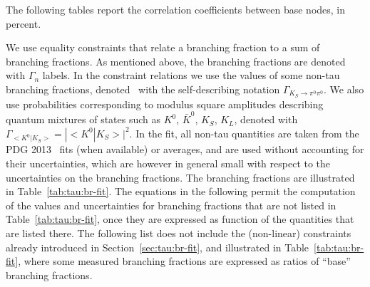 \label{sec:tau:fitcorr}

The following tables report the correlation coefficients between base nodes,
in percent.


\label{sec:tau:constraints}

We use equality constraints that relate a branching fraction to a sum of
branching fractions. As mentioned above, the \mtau branching fractions are
denoted with $\Gamma_n$ labels. In the constraint relations we use the
values of some non-tau branching fractions, denoted \eg\ with the
self-describing notation $\Gamma_{K_S \to \pi^0\pi^0}$. We also use
probabilities corresponding to modulus square amplitudes describing quantum
mixtures of states such as $K^0$, $\bar{K}^0$, $K_S$, $K_L$, denoted with
\eg\ $\Gamma_{<K^0|K_S>} = |{<}K^0|K_S{>}|^2$.
In the fit, all non-tau quantities are taken from the PDG 2013~\cite{PDG_2012}
fits (when available) or averages, and are used without accounting for their
uncertainties, which are however in general small with respect
to the uncertainties on the \mtau branching fractions.
The \mtau branching fractions are illustrated in Table~\ref{tab:tau:br-fit}.
The equations in the following permit the computation of the values and
uncertainties for branching fractions that are not listed in
Table~\ref{tab:tau:br-fit}, once they are expressed as function of the
quantities that are listed there. The following list does not include the
(non-linear) constraints already introduced in
Section~\ref{sec:tau:br-fit}, and illustrated in
Table~\ref{tab:tau:br-fit}, where some measured branching fractions are
expressed as ratios of ``base'' branching fractions.

\begin{envsmall}
  \setlength\abovedisplayskip{0pt}
  \setlength\belowdisplayshortskip{0pt}
  \ifhevea\renewcommand{\bar}[1]{\textoverline{#1}}\fi
\end{envsmall}

\label{sec:tau:lifetime}


